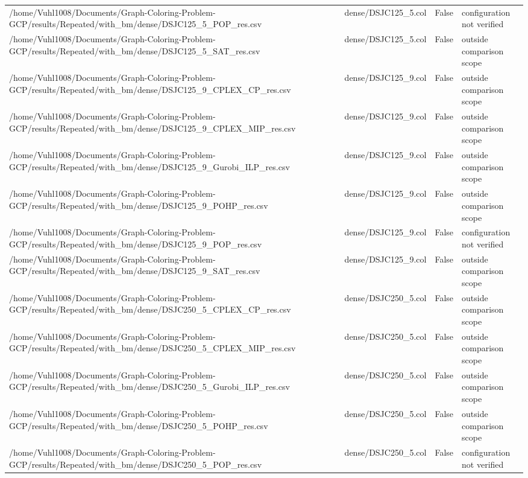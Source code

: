 \begin{table}[htbp]
\begin{tabular}{llll}
/home/Vuhl1008/Documents/Graph-Coloring-Problem-GCP/results/Repeated/with\_bm/dense/DSJC125\_5\_POP\_res.csv & dense/DSJC125\_5.col & False & configuration not verified \\
/home/Vuhl1008/Documents/Graph-Coloring-Problem-GCP/results/Repeated/with\_bm/dense/DSJC125\_5\_SAT\_res.csv & dense/DSJC125\_5.col & False & outside comparison scope \\
/home/Vuhl1008/Documents/Graph-Coloring-Problem-GCP/results/Repeated/with\_bm/dense/DSJC125\_9\_CPLEX\_CP\_res.csv & dense/DSJC125\_9.col & False & outside comparison scope \\
/home/Vuhl1008/Documents/Graph-Coloring-Problem-GCP/results/Repeated/with\_bm/dense/DSJC125\_9\_CPLEX\_MIP\_res.csv & dense/DSJC125\_9.col & False & outside comparison scope \\
/home/Vuhl1008/Documents/Graph-Coloring-Problem-GCP/results/Repeated/with\_bm/dense/DSJC125\_9\_Gurobi\_ILP\_res.csv & dense/DSJC125\_9.col & False & outside comparison scope \\
/home/Vuhl1008/Documents/Graph-Coloring-Problem-GCP/results/Repeated/with\_bm/dense/DSJC125\_9\_POHP\_res.csv & dense/DSJC125\_9.col & False & outside comparison scope \\
/home/Vuhl1008/Documents/Graph-Coloring-Problem-GCP/results/Repeated/with\_bm/dense/DSJC125\_9\_POP\_res.csv & dense/DSJC125\_9.col & False & configuration not verified \\
/home/Vuhl1008/Documents/Graph-Coloring-Problem-GCP/results/Repeated/with\_bm/dense/DSJC125\_9\_SAT\_res.csv & dense/DSJC125\_9.col & False & outside comparison scope \\
/home/Vuhl1008/Documents/Graph-Coloring-Problem-GCP/results/Repeated/with\_bm/dense/DSJC250\_5\_CPLEX\_CP\_res.csv & dense/DSJC250\_5.col & False & outside comparison scope \\
/home/Vuhl1008/Documents/Graph-Coloring-Problem-GCP/results/Repeated/with\_bm/dense/DSJC250\_5\_CPLEX\_MIP\_res.csv & dense/DSJC250\_5.col & False & outside comparison scope \\
/home/Vuhl1008/Documents/Graph-Coloring-Problem-GCP/results/Repeated/with\_bm/dense/DSJC250\_5\_Gurobi\_ILP\_res.csv & dense/DSJC250\_5.col & False & outside comparison scope \\
/home/Vuhl1008/Documents/Graph-Coloring-Problem-GCP/results/Repeated/with\_bm/dense/DSJC250\_5\_POHP\_res.csv & dense/DSJC250\_5.col & False & outside comparison scope \\
/home/Vuhl1008/Documents/Graph-Coloring-Problem-GCP/results/Repeated/with\_bm/dense/DSJC250\_5\_POP\_res.csv & dense/DSJC250\_5.col & False & configuration not verified \\

\end{tabular}
\end{table}
